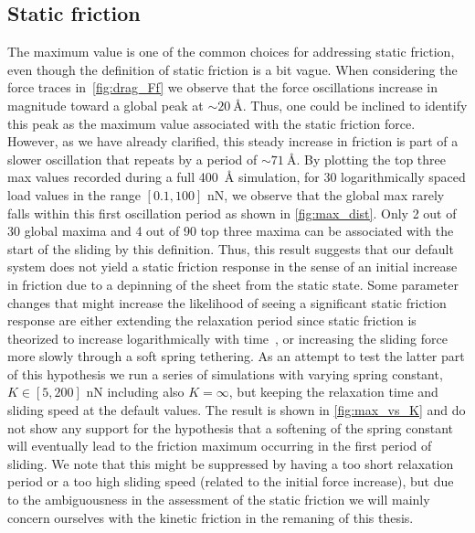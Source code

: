 \subsection{Static friction} 
The maximum value is one of the common choices for addressing static friction,
even though the definition of static friction is a bit vague. When considering
the force traces in~\cref{fig:drag_Ff} we observe that the force oscillations
increase in magnitude toward a global peak at $\sim \SI{20}{\text{Å}}$. Thus,
one could be inclined to identify this peak as the maximum value associated with
the static friction force. However, as we have already clarified, this steady
increase in friction is part of a slower oscillation that repeats by a period of
$\sim \SI{71}{\text{Å}}$. By plotting the top three max values recorded during a
full \SI{400}{Å} simulation, for 30 logarithmically spaced load values in the
range $[0.1, 100]$ nN, we observe that the global max rarely falls within this
first oscillation period as shown in \cref{fig:max_dist}. Only 2 out of 30
global maxima and 4 out of 90 top three maxima can be associated with the start
of the sliding by this definition. Thus, this result suggests that our default
system does not yield a static friction response in the sense of an initial
increase in friction due to a depinning of the sheet from the static state. Some
parameter changes that might increase the likelihood of seeing a significant
static friction response are either extending the relaxation period since static
friction is theorized to increase logarithmically with
time~\cite{dieterich_1972}, or increasing the sliding force more slowly through a soft spring tethering. As an attempt to test the latter part of this hypothesis
we run a series of simulations with varying spring constant, $K\in [5, 200]$ nN
including also $K = \infty$, but keeping the relaxation time and sliding speed at
the default values. The result is shown in \cref{fig:max_vs_K} and do
not show any support for the hypothesis that a softening of the spring constant
will eventually lead to the friction maximum occurring in the first period of sliding. We note that this might be suppressed by having a too short relaxation period or a too high sliding speed (related to the initial force increase),
but due to the ambiguousness in the assessment of the static friction we will
mainly concern ourselves with the kinetic friction in the remaning of this
thesis.






